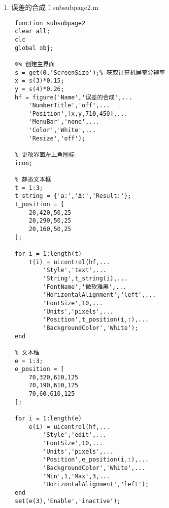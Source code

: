 \begin{enumerate}
\begin{lstlisting}
 function imp(a,b)
 global data_cell;
 global obj;
 [FileName,PathName,FilterIndex] = uigetfile(...
     {'*.txt','Text Data Files(*.txt)';...
     '*.xls','Excel 工作薄(*.xls)'});
 if FileName==0
     return;
 end
 if FilterIndex==1
 	data = load(strcat(PathName,FileName));
 else
 	data = xlsread(strcat(PathName,FileName));
 end
 s = size(data);
 data_cell = cell(s(1),1);
 for i = 1:s(1)
 	a = data(i,:);
 	a(isnan(a)) = [];
 	data_cell{i} = a;
 end
 tip = '第1组数据';
 for i=2:(s(1))
 	tip = strcat(tip,'|第',num2str(i),'组数据');
 end
 set(obj(3),'String',tip);
 set(obj(21),'String',data_cell{1});
 msgbox('导入成功','提示','warn');
 
 function outp(a,b)
 global obj;
 header = {'数据','置信系数','平均值','标准差','剔除粗大误差后平均值','剔除粗大误差后标准差',...
           '算术平均值标准差','数据的权','加权算术平均值','加权算术平均值标准差','结果'};
 a = num2str(get(obj(3),'Value'));
 n = [20:-1:18 16:-1:9];
 for i = 1:length(n)
     str{i} = get(obj(n(i)),'String');
 end
 values = {strcat('第',a,'组数据'),str{1:9},strcat(str{10},'±',str{11})};
 xlswrite(strcat(datestr(now,30),'.xls'),[header;values]);
 msgbox('保存成功','提示','warn');\end{lstlisting}
	\item 误差的合成：subsubpage2.m
	\begin{lstlisting}
 function subsubpage2
 clear all;
 clc
 global obj;
 
 %% 创建主界面
 s = get(0,'ScreenSize');% 获取计算机屏幕分辨率
 x = s(3)*0.15;
 y = s(4)*0.26;
 hf = figure('Name','误差的合成',...
     'NumberTitle','off',...
     'Position',[x,y,710,450],...
     'MenuBar','none',...
     'Color','White',...
     'Resize','off');
 
 % 更改界面左上角图标
 icon;
 
 % 静态文本框
 t = 1:3;
 t_string = {'a:','Δ:','Result:'};
 t_position = [
     20,420,50,25
     20,290,50,25
     20,160,50,25
 ];
 
 for i = 1:length(t)
     t(i) = uicontrol(hf,...
         'Style','text',...
         'String',t_string(i),...
         'FontName','微软雅黑',...
         'HorizontalAlignment','left',...
         'FontSize',10,...
         'Units','pixels',...
         'Position',t_position(i,:),...
         'BackgroundColor','White');
 end
 
 % 文本框
 e = 1:3;
 e_position = [
     70,320,610,125
     70,190,610,125
     70,60,610,125
 ];
 
 for i = 1:length(e)
     e(i) = uicontrol(hf,...
         'Style','edit',...
         'FontSize',10,...
         'Units','pixels',...
         'Position',e_position(i,:),...
         'BackgroundColor','White',...
         'Min',1,'Max',3,...
         'HorizontalAlignment','left');
 end
 set(e(3),'Enable','inactive');
 

\end{lstlisting}
\end{enumerate}
